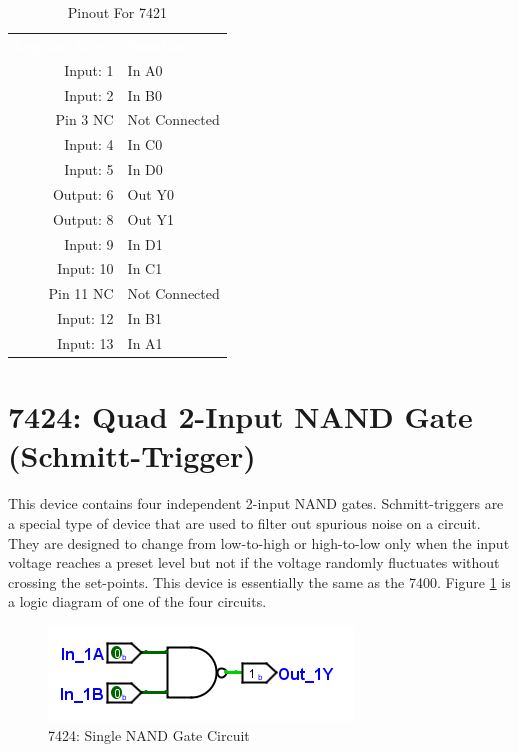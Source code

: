 \begin{table}[H]
	\sffamily
	\newcommand{\head}[1]{\textcolor{white}{\textbf{#1}}}		
	\begin{center}
		\begin{tabular}{rl} 
			\rowcolor{black!75}
			\head{Logisim Label} & \head{Function} \\
			Input: 1   & In A0  \\
			Input: 2   & In B0  \\
			Pin 3 NC   & Not Connected \\
			Input: 4   & In C0  \\
			Input: 5   & In D0  \\
			Output: 6  & Out Y0 \\
			Output: 8  & Out Y1 \\
			Input: 9   & In D1  \\
			Input: 10  & In C1  \\
			Pin 11 NC  & Not Connected \\
			Input: 12 & In B1  \\
			Input: 13  & In A1  \\
		\end{tabular}
	\end{center}
	\caption{Pinout For 7421}
	\label{tab:50-7421}
\end{table}

\section{7424: Quad 2-Input NAND Gate (Schmitt-Trigger)}

This device contains four independent 2-input NAND gates. Schmitt-triggers are a special type of device that are used to filter out spurious noise on a circuit. They are designed to change from low-to-high or high-to-low only when the input voltage reaches a preset level but not if the voltage randomly fluctuates without crossing the set-points. This device is essentially the same as the 7400.  Figure \ref{fig:app_ttl-7424} is a logic diagram of one of the four circuits.

\begin{figure}[H]
	\centering
	\includegraphics{gfx/app_ttl-7400}
	\caption{7424: Single NAND Gate Circuit}
	\label{fig:app_ttl-7424}
\end{figure}

